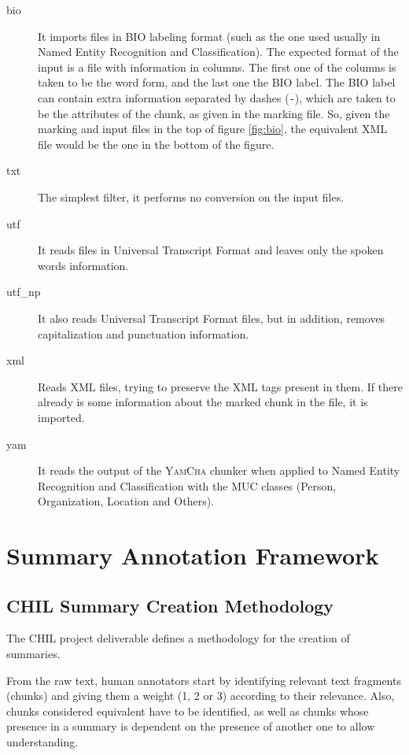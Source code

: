 \documentclass{article}
\begin{document}
\begin{description}
\item [bio] It imports files in BIO labeling format (such as the one
  used usually in Named Entity Recognition and Classification). The
  expected format of the input is a file with information in columns.
  The first one of the columns is taken to be the word form, and the
  last one the BIO label. The BIO label can contain extra information
  separated by dashes (\verb|-|), which are taken to be the attributes
  of the chunk, as given in the marking file. So, given the marking
  and input files in the top of figure \ref{fig:bio}, the equivalent
  XML file would be the one in the bottom of the figure.
\item [txt] The simplest filter, it performs no conversion on the
input files.
\item [utf] It reads files in Universal Transcript Format and leaves
only the spoken words information.
\item [utf\_np] It also reads Universal Transcript Format files, but in
addition, removes capitalization and punctuation information.
\item [xml] Reads XML files, trying to preserve the XML tags present
  in them. If there already is some information about the marked chunk
  in the file, it is imported.
\item [yam] It reads the output of the \textsc{YamCha} \cite{kudo01}
chunker when applied to Named Entity Recognition and Classification
with the MUC classes (Person, Organization, Location and Others).
\end{description}

\appendix

\section{Summary Annotation Framework}
\subsection{CHIL Summary Creation Methodology}
The \cite{fuentes05chil} CHIL project deliverable defines a methodology
for the creation of summaries.

From the raw text, human annotators start by identifying relevant text
fragments (chunks) and giving them a weight (1, 2 or 3) according to
their relevance. Also, chunks considered equivalent have to be
identified, as well as chunks whose presence in a summary is dependent
on the presence of another one to allow understanding.
\end{document}
